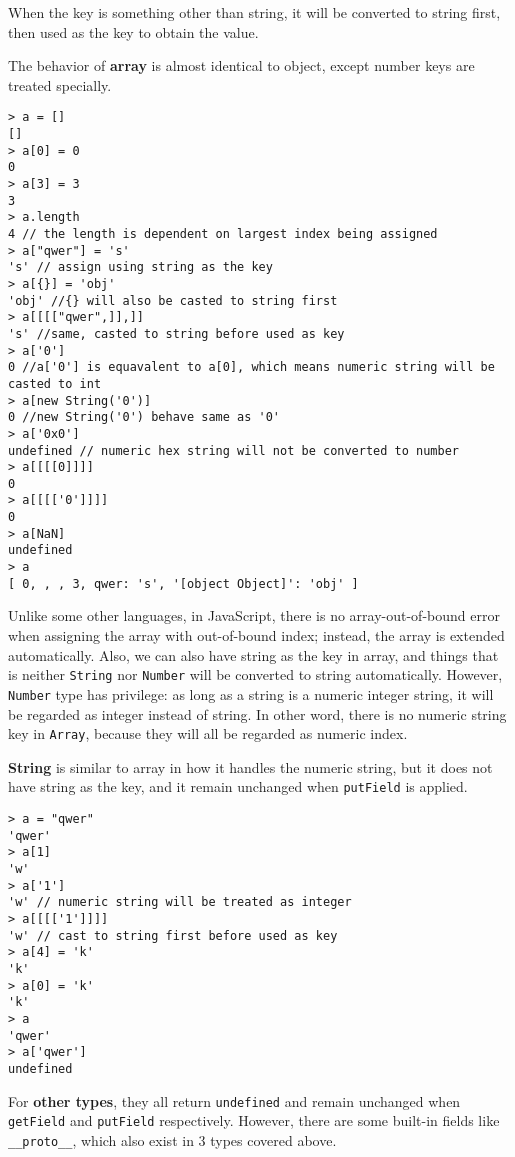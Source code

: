 {When the key is something other than string, it will be converted to string first, then used as the key to obtain the value.

The behavior of \textbf{array} is almost identical to object, except number keys are treated specially.

\begin{verbatim}
> a = []
[]
> a[0] = 0
0
> a[3] = 3
3
> a.length
4 // the length is dependent on largest index being assigned
> a["qwer"] = 's'
's' // assign using string as the key
> a[{}] = 'obj'
'obj' //{} will also be casted to string first
> a[[[["qwer",]],]]
's' //same, casted to string before used as key
> a['0']
0 //a['0'] is equavalent to a[0], which means numeric string will be casted to int
> a[new String('0')]
0 //new String('0') behave same as '0'
> a['0x0']
undefined // numeric hex string will not be converted to number
> a[[[[0]]]]
0
> a[[[['0']]]]
0
> a[NaN]
undefined
> a
[ 0, , , 3, qwer: 's', '[object Object]': 'obj' ]
\end{verbatim}

Unlike some other languages, in JavaScript, there is no array-out-of-bound error when assigning the array with out-of-bound index; instead, the array is extended automatically. Also, we can also have string as the key in array, and things that is neither \texttt{String} nor \texttt{Number} will be converted to string automatically. However, \texttt{Number} type has privilege: as long as a string is a numeric integer string, it will be regarded as integer instead of string. In other word, there is no numeric string key in \texttt{Array}, because they will all be regarded as numeric index.

\textbf{String} is similar to array in how it handles the numeric string, but it does not have string as the key, and it remain unchanged when \texttt{putField} is applied.

\begin{verbatim}
> a = "qwer"
'qwer'
> a[1]
'w'
> a['1']
'w' // numeric string will be treated as integer
> a[[[['1']]]]
'w' // cast to string first before used as key
> a[4] = 'k'
'k'
> a[0] = 'k'
'k'
> a
'qwer'
> a['qwer']
undefined
\end{verbatim}

For \textbf{other types}, they all return \texttt{undefined} and  remain unchanged when \texttt{getField} and \texttt{putField} respectively. However, there are some built-in fields like \texttt{__proto__}, which also exist in 3 types covered above.

}

